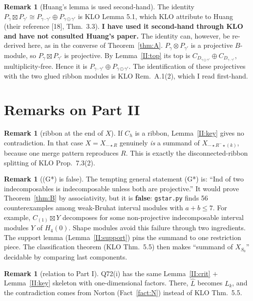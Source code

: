 \documentclass[11pt]{amsart}
\newcommand{\sq}{\boxtimes}
\theoremstyle{plain}
\theoremstyle{definition}
\newtheorem{remarkII}[lemmaII]{Remark}
\begin{document}
\begin{remarkII}[Huang's lemma is used second-hand]\label{II:huang}
The identity $P_\gamma\sq P_{\gamma'}\cong P_{\gamma\cdot\gamma'}\oplus P_{\gamma\odot\gamma'}$ is KLO Lemma 5.1, which KLO attribute to Huang (their reference [18], Thm.~3.3). \textbf{I have used it second-hand through KLO and have not consulted Huang's paper.} The identity can, however, be re-derived here, as in the converse of Theorem~\ref{thm:A}. $P_\gamma\otimes P_{\gamma'}$ is a projective $B$-module, so $P_\gamma\sq P_{\gamma'}$ is projective. By Lemma~\ref{II:top} its top is $C_{D_{\gamma\odot\gamma'}}\oplus C_{D_{\gamma\cdot\gamma'}}$, multiplicity-free. Hence it is $P_{\gamma\cdot\gamma'}\oplus P_{\gamma\odot\gamma'}$. The identification of these projectives with the two glued ribbon modules is KLO Rem.~A.1(2), which I read first-hand.
\end{remarkII}

\section{Remarks on Part II}

\begin{remarkII}[ribbon at the end of $X$]
If $C_h$ is a ribbon, Lemma~\ref{II:key} gives no contradiction. In that case $X=X_{\cdots\star R}$ genuinely \emph{is} a summand of $X_{\cdots\star R^-\star(k)}$, because one merge pattern reproduces $R$. This is exactly the disconnected-ribbon splitting of KLO Prop.~7.3(2).
\end{remarkII}

\begin{remarkII}[(G*) is false]
The tempting general statement (G*) is: ``Ind of two indecomposables is indecomposable unless both are projective.'' It would prove Theorem~\ref{thm:B} by associativity, but it is \textbf{false}: \texttt{gstar.py} finds 56 counterexamples among weak-Bruhat interval modules with $a+b\le7$. For example, $C_{(1)}\sq Y$ decomposes for some non-projective indecomposable interval modules $Y$ of $H_4(0)$. Shape modules avoid this failure through two ingredients. The support lemma (Lemma~\ref{II:support}) pins the summand to one restriction piece. The classification theorem (KLO Thm.~5.5) then makes ``summand of $X_{S_0}$'' decidable by comparing last components.
\end{remarkII}

\begin{remarkII}[relation to Part I]
Q72(i) has the same Lemma~\ref{II:crit} $+$ Lemma~\ref{II:key} skeleton with one-dimensional factors. There, $\widehat L$ becomes $L_k$, and the contradiction comes from Norton (Fact~\ref{fact:N}) instead of KLO Thm.~5.5.
\end{remarkII}
\end{document}
